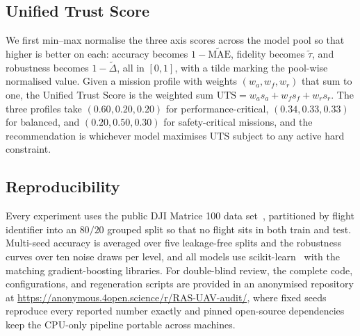 \documentclass[conference]{IEEEtran}
\begin{document}
\appendix
\subsection{Unified Trust Score}
We first min--max normalise the three axis scores across the model pool so that higher is better on each: accuracy becomes $1-\widetilde{\mathrm{MAE}}$, fidelity becomes $\tilde\tau$, and robustness becomes $1-\widetilde{\Delta}$, all in $[0,1]$, with a tilde marking the pool-wise normalised value. Given a mission profile with weights $(w_a,w_f,w_r)$ that sum to one, the Unified Trust Score is the weighted sum $\mathrm{UTS}=w_a s_a + w_f s_f + w_r s_r$. The three profiles take $(0.60,0.20,0.20)$ for performance-critical, $(0.34,0.33,0.33)$ for balanced, and $(0.20,0.50,0.30)$ for safety-critical missions, and the recommendation is whichever model maximises UTS subject to any active hard constraint.

\subsection{Reproducibility}
Every experiment uses the public DJI Matrice 100 data set~\cite{rodrigues2021drone}, partitioned by flight identifier into an $80/20$ grouped split so that no flight sits in both train and test. Multi-seed accuracy is averaged over five leakage-free splits and the robustness curves over ten noise draws per level, and all models use scikit-learn~\cite{pedregosa2011scikit} with the matching gradient-boosting libraries. For double-blind review, the complete code, configurations, and regeneration scripts are provided in an anonymised repository at \url{https://anonymous.4open.science/r/RAS-UAV-audit/}, where fixed seeds reproduce every reported number exactly and pinned open-source dependencies keep the CPU-only pipeline portable across machines.



\end{document}
